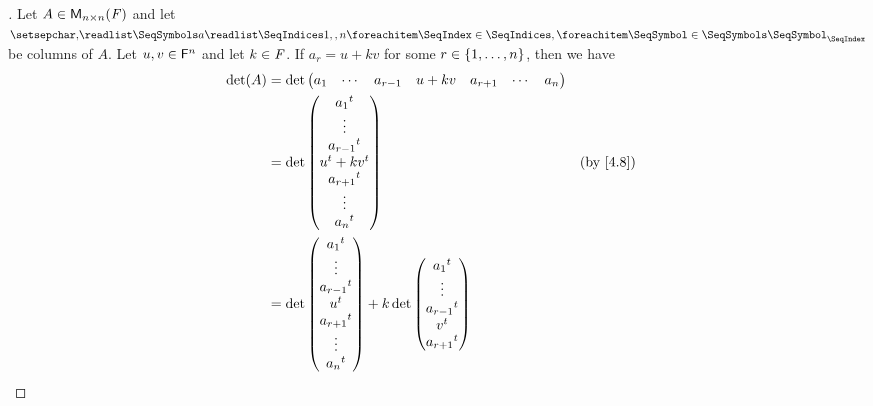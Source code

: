 \begin{proof}[]
  Let \(A \in \mathsf{M}_{{n} \times n}({\mathit{F}})\) and let \(\seq{a}{1,,n}\) be columns of \(A\).
  Let \(u, v \in \mathsf{F}^n\) and let \(k \in \mathit{F}\).
  If \(a_r = u + kv\) for some \(r \in \left\lbrace1, \dots, n\right\rbrace\), then we have
  \begin{align*}
    \det(A) & = \det\begin{pmatrix}
                      a_1 & \cdots & a_{r - 1} & u + kv & a_{r + 1} & \cdots & a_n
                    \end{pmatrix}                            \\
            & = \det\begin{pmatrix}
                      \tp{a_1}          \\
                      \vdots            \\
                      \tp{a_{r - 1}}    \\
                      \tp{u} + k \tp{v} \\
                      \tp{a_{r + 1}}    \\
                      \vdots            \\
                      \tp{a_n}
                    \end{pmatrix}                      &  & \text{(by \cref{4.8})}                          \\
            & = \det\begin{pmatrix}
                      \tp{a_1}       \\
                      \vdots         \\
                      \tp{a_{r - 1}} \\
                      \tp{u}         \\
                      \tp{a_{r + 1}} \\
                      \vdots         \\
                      \tp{a_n}
                    \end{pmatrix} + k \det\begin{pmatrix}
                                            \tp{a_1}       \\
                                            \vdots         \\
                                            \tp{a_{r - 1}} \\
                                            \tp{v}         \\
                                            \tp{a_{r + 1}} \\

\end{pmatrix}
\end{align*}
\end{proof}
